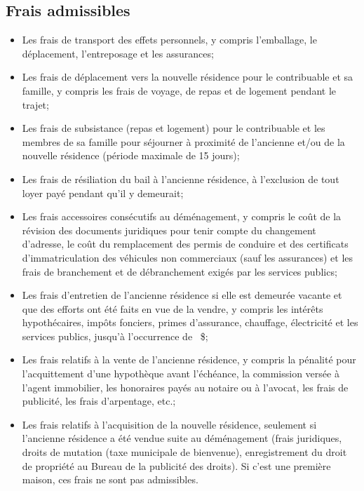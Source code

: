 \subsection{Frais admissibles}
\begin{itemize}[label=]
	\item Les frais de transport des effets personnels, y compris l'emballage, le déplacement, l'entreposage et les assurances;
	\item Les frais de déplacement vers la nouvelle résidence pour le contribuable et sa famille, y compris les frais de voyage, de repas et de logement pendant le trajet;
	\item Les frais de subsistance (repas et logement) pour le contribuable et les membres de sa famille pour séjourner à proximité de l'ancienne et/ou de la nouvelle résidence (période maximale de 15 jours);
	\item Les frais de résiliation du bail à l'ancienne résidence, à l'exclusion de tout loyer payé pendant qu'il y demeurait;
	\item Les frais accessoires consécutifs au déménagement, y compris le coût de la révision des documents juridiques pour tenir compte du changement d'adresse, le coût du remplacement des permis de conduire et des certificats d'immatriculation des véhicules non commerciaux (sauf les assurances) et les frais de branchement et de débranchement exigés par les services publics;
	\item Les frais d'entretien de l'ancienne résidence si elle est demeurée vacante et que des efforts ont été faits en vue de la vendre, y compris les intérêts hypothécaires, impôts fonciers, primes d'assurance, chauffage, électricité et les services publics, jusqu'à l'occurrence de ~\$;
	\item Les frais relatifs à la vente de l'ancienne résidence, y compris la pénalité pour l'acquittement d'une hypothèque avant l'échéance, la commission versée à l'agent immobilier, les honoraires payés au notaire ou à l'avocat, les frais de publicité, les frais d'arpentage, etc.; 
	\item Les frais relatifs à l'acquisition de la nouvelle résidence, seulement si l'ancienne résidence a été vendue suite au déménagement (frais juridiques, droits de mutation (taxe municipale de bienvenue), enregistrement du droit de propriété au Bureau de la publicité des droits). Si c'est une première maison, ces frais ne sont pas admissibles.
\end{itemize}


